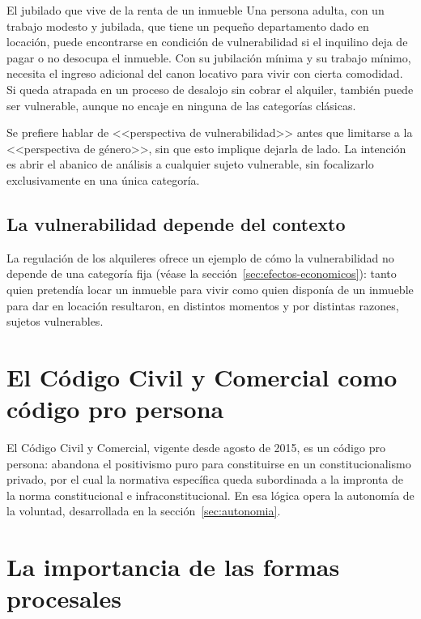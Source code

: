 \documentclass[12pt,oneside]{book}
\begin{document}
\begin{example}{El jubilado que vive de la renta de un inmueble}
Una persona adulta, con un trabajo modesto y jubilada, que tiene un pequeño departamento dado en locación, puede encontrarse en condición de vulnerabilidad si el inquilino deja de pagar o no desocupa el inmueble. Con su jubilación mínima y su trabajo mínimo, necesita el ingreso adicional del canon locativo para vivir con cierta comodidad. Si queda atrapada en un proceso de desalojo sin cobrar el alquiler, también puede ser vulnerable, aunque no encaje en ninguna de las categorías clásicas.
\end{example}

\begin{important}
Se prefiere hablar de <<perspectiva de vulnerabilidad>> antes que limitarse a la <<perspectiva de género>>, sin que esto implique dejarla de lado. La intención es abrir el abanico de análisis a cualquier sujeto vulnerable, sin focalizarlo exclusivamente en una única categoría.
\end{important}

\subsection{La vulnerabilidad depende del contexto}

La regulación de los alquileres ofrece un ejemplo de cómo la vulnerabilidad no depende de una categoría fija (véase la sección~\ref{sec:efectos-economicos}): tanto quien pretendía locar un inmueble para vivir como quien disponía de un inmueble para dar en locación resultaron, en distintos momentos y por distintas razones, sujetos vulnerables.

\section{El Código Civil y Comercial como código pro persona}

El Código Civil y Comercial, vigente desde agosto de 2015, es un código pro persona: abandona el positivismo puro para constituirse en un constitucionalismo privado, por el cual la normativa específica queda subordinada a la impronta de la norma constitucional e infraconstitucional. En esa lógica opera la autonomía de la voluntad, desarrollada en la sección~\ref{sec:autonomia}.

\section{La importancia de las formas procesales}
\end{document}

